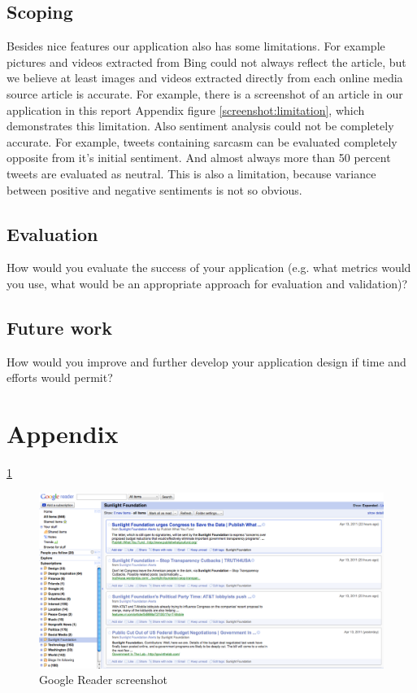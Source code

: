 \documentclass{acm_proc_10ptArticle-sp}
\begin{document}
\subsection{Scoping}

Besides nice features our application also has some limitations. For example pictures and videos extracted from Bing could not always reflect the article, but we believe at least images and videos extracted directly from each online media source article is accurate. For example, there is a screenshot of an article in our application in this report Appendix figure \ref{screenshot:limitation}, which demonstrates this limitation. Also sentiment analysis could not be completely accurate. For example, tweets containing sarcasm can be evaluated completely opposite from it's initial sentiment. And almost always more than 50 percent tweets are evaluated as neutral. This is also a limitation, because variance between positive and negative sentiments is not so obvious.

\subsection{Evaluation}

How would you evaluate the success of your application (e.g. what metrics would you use, what would be an appropriate approach for evaluation and validation)?

\subsection{Future work}

How would you improve and further develop your application design if time  and efforts would permit?








\newpage

\onecolumn
\section{Appendix}

\ref{screenshot:reader}
\begin{figure}[H]
  \centering
  \includegraphics[width=0.9\linewidth]{img/Google-Reader.png}
  \caption{Google Reader screenshot}
  \label{screenshot:reader}
\end{figure}
\end{document}
